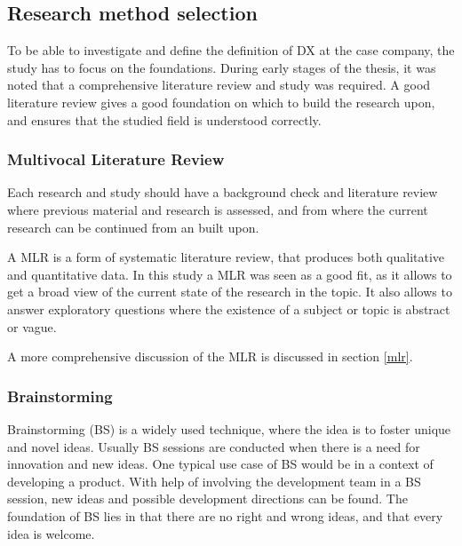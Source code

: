 \documentclass[english, 12pt, a4paper, sci, utf8, a-1b, online]{aaltothesis}
\begin{document}
\subsection{Research method selection}

To be able to investigate and define the definition of DX at the case company, the study has to focus on the foundations. During early stages of the thesis, it was noted that a comprehensive literature review and study was required. A good literature review gives a good foundation on which to build the research upon, and ensures that the studied field is understood correctly.

\subsubsection{Multivocal Literature Review}

Each research and study should have a background check and literature review where previous material and research is assessed, and from where the current research can be continued from an built upon.

A MLR is a form of systematic literature review, that produces both qualitative and quantitative data. In this study a MLR was seen as a good fit, as it allows to get a broad view of the current state of the research in the topic. It also allows to answer exploratory questions where the existence of a subject or topic is abstract or vague.

A more comprehensive discussion of the MLR is discussed in section \ref{mlr}.


\subsubsection{Brainstorming}

Brainstorming (BS) is a widely used technique, where the idea is to foster unique and novel ideas. Usually BS sessions are conducted when there is a need for innovation and new ideas. One typical use case of BS would be in a context of developing a product. With help of involving the development team in a BS session, new ideas and possible development directions can be found. The foundation of BS lies in that there are no right and wrong ideas, and that every idea is welcome.
\end{document}
